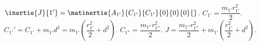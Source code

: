 \begin{corrigebox}[Corrigé]
$\inertie{J}{1'}=\matinertie{A_{1'}}{C_{1'}}{C_{1'}}{0}{0}{0}{}$.
$C_{1'}=\dfrac{m_{1'}r_{1'}^2}{2}$.
$C_{1'}'=C_{1'}+m_{1'}d^2=m_{1'}\left(\dfrac{r_{1'}^2}{2}+d^2\right)$.
$C_{1''}=\dfrac{m_{1''}r_{1''}^2}{2}$.
$J=\dfrac{m_{1''}r_{1''}^2}{2}+m_{1'}\left(\dfrac{r_{1'}^2}{2}+d^2\right)$.
\end{corrigebox}
